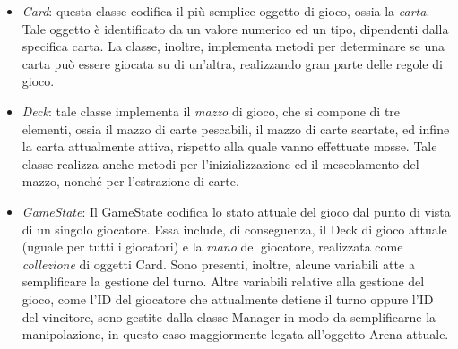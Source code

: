 \documentclass[11pt]{article} %
\begin{document}
\begin{itemize}
	\item \emph{Card}: questa classe codifica il più semplice oggetto di gioco, ossia la \textit{carta}. Tale oggetto è identificato da un valore numerico ed un tipo, dipendenti dalla specifica carta. La classe, inoltre, implementa metodi per determinare se una carta può essere giocata su di un'altra, realizzando gran parte delle regole di gioco.
	\item \emph{Deck}: tale classe implementa il \textit{mazzo} di gioco, che si compone di tre elementi, ossia il mazzo di carte pescabili, il mazzo di carte scartate, ed infine la carta attualmente attiva, rispetto alla quale vanno effettuate mosse. Tale classe realizza anche metodi per l'inizializzazione ed il mescolamento del mazzo, nonché per l'estrazione di carte. 
	\item \emph{GameState}: Il GameState codifica lo stato attuale del gioco dal punto di vista di un singolo giocatore. Essa include, di conseguenza, il Deck di gioco attuale (uguale per tutti i giocatori) e la \textit{mano} del giocatore, realizzata come \textit{collezione} di oggetti Card. Sono presenti, inoltre, alcune variabili atte a semplificare la gestione del turno. Altre variabili relative alla gestione del gioco, come l'ID del giocatore che attualmente detiene il turno oppure l'ID del vincitore, sono gestite dalla classe Manager in modo da semplificarne la manipolazione, in questo caso maggiormente legata all'oggetto Arena attuale.
\end{itemize} 
\end{document}

